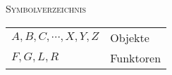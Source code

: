 \documentclass[a4paper]{amsart}
\theoremstyle{definition}
\begin{document}
\begin{large}
    \centerline{\textsc{Symbolverzeichnis}}
\end{large}
\bigskip

\renewcommand*{\arraystretch}{1}

\begin{tabular}{ll}
    $A, B, C, \cdots, X, Y, Z$          & Objekte\\
    $F,G,L,R$ & Funktoren\\

\end{tabular}
\end{document}

